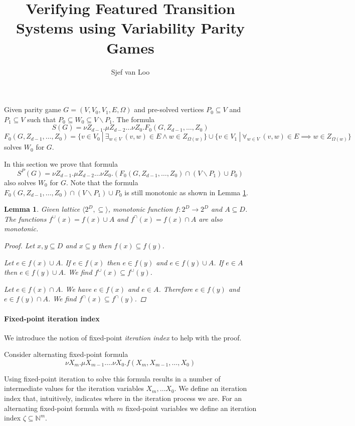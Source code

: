 \documentclass[]{article}
\title{Verifying Featured Transition Systems using Variability Parity Games}
\author{Sjef van Loo}
\newtheorem{lemma}[theorem]{Lemma}
\begin{document}
	Given parity game $G = (V,V_0,V_1,E,\Omega)$ and pre-solved vertices $P_0 \subseteq V$ and $P_1 \subseteq V$ such that $P_0 \subseteq W_0 \subseteq V\backslash P_1$. The formula
	\[ S(G) = \nu Z_{d-1}.\mu Z_{d-2}\dots \nu Z_0.F_0(G,Z_{d-1},\dots,Z_0) \]
	\[ F_0(G,Z_{d-1},\dots,Z_0) = \{v \in V_0\ |\ \exists_{w\in V}\ (v,w) \in E \wedge w\in Z_{\Omega(w)}\} \cup \{ v\in V_1\ |\ \forall_{w\in V}\ (v,w) \in E \implies w\in Z_{\Omega(w)}\} \]
	solves $W_0$ for $G$.
	
	In this section we prove that formula 
	\[ S^P(G) = \nu Z_{d-1}.\mu Z_{d-2}\dots \nu Z_0.(F_0(G,Z_{d-1},\dots,Z_0) \cap (V\backslash P_1) \cup P_0) \]
	also solves $W_0$ for $G$. Note that the formula $F_0(G,Z_{d-1},\dots,Z_0) \cap (V\backslash P_1) \cup P_0$ is still monotonic as shown in Lemma \ref{lem_monotonic_union}.
	\begin{lemma}
		\label{lem_monotonic_union}
		Given lattice $\langle 2^D, \subseteq \rangle $, monotonic function $f :  2^D \rightarrow 2^D$ and $A \subseteq D$. The functions $f^\cup(x) = f(x) \cup A$ and $f^\cap(x) = f(x) \cap A$ are also monotonic.
		\begin{proof}
			Let $x,y \subseteq D$ and $x\subseteq y$ then $f(x) \subseteq f(y)$.
			
			Let $e \in f(x) \cup A$. If $e \in f(x)$ then $e \in f(y)$ and $e \in f(y) \cup A$. If $e \in A$ then $e \in f(y) \cup A$. We find $f^\cup(x) \subseteq f^\cup(y)$.
			
			Let $e \in f(x) \cap A$. We have $e \in f(x)$ and $e \in A$. Therefore $e \in f(y)$ and $e \in f(y) \cap A$. We find $f^\cap(x) \subseteq f^\cap(y)$.
		\end{proof}
	\end{lemma}

	\paragraph{Fixed-point iteration index}
	We introduce the notion of fixed-point \textit{iteration index} to help with the proof.
	
	Consider alternating fixed-point formula
	\[ \nu X_m.\mu X_{m-1}\dots.\nu X_0.f(X_m,X_{m-1},\dots,X_0) \]
	
	Using fixed-point iteration to solve this formula results in a number of intermediate values for the iteration variables $X_m,\dots X_0$. We define an iteration index that, intuitively, indicates where in the iteration process we are. For an alternating fixed-point formula with $m$ fixed-point variables we define an iteration index $\zeta \subseteq \mathbb{N}^m$.
	
\end{document}
